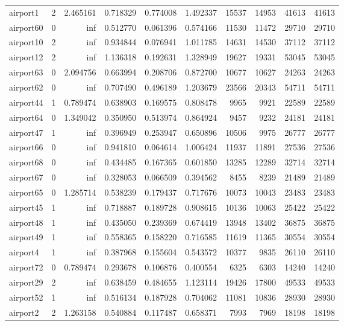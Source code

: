 \begin{longtable}{|l|r|r|r|r|r|r|r|r|r|}
airport1 & 2 & 2.465161 & 0.718329 & 0.774008 & 1.492337 & 15537 & 14953 & 41613 & 41613 \\
airport60 & 0 & inf & 0.512770 & 0.061396 & 0.574166 & 11530 & 11472 & 29710 & 29710 \\
airport10 & 2 & inf & 0.934844 & 0.076941 & 1.011785 & 14631 & 14530 & 37112 & 37112 \\
airport12 & 2 & inf & 1.136318 & 0.192631 & 1.328949 & 19627 & 19331 & 53045 & 53045 \\
airport63 & 0 & 2.094756 & 0.663994 & 0.208706 & 0.872700 & 10677 & 10627 & 24263 & 24263 \\
airport62 & 0 & inf & 0.707490 & 0.496189 & 1.203679 & 23566 & 20343 & 54711 & 54711 \\
airport44 & 1 & 0.789474 & 0.638903 & 0.169575 & 0.808478 & 9965 & 9921 & 22589 & 22589 \\
airport64 & 0 & 1.349042 & 0.350950 & 0.513974 & 0.864924 & 9457 & 9232 & 24181 & 24181 \\
airport47 & 1 & inf & 0.396949 & 0.253947 & 0.650896 & 10506 & 9975 & 26777 & 26777 \\
airport66 & 0 & inf & 0.941810 & 0.064614 & 1.006424 & 11937 & 11891 & 27536 & 27536 \\
airport68 & 0 & inf & 0.434485 & 0.167365 & 0.601850 & 13285 & 12289 & 32714 & 32714 \\
airport67 & 0 & inf & 0.328053 & 0.066509 & 0.394562 & 8455 & 8239 & 21489 & 21489 \\
airport65 & 0 & 1.285714 & 0.538239 & 0.179437 & 0.717676 & 10073 & 10043 & 23483 & 23483 \\
airport45 & 1 & inf & 0.718887 & 0.189728 & 0.908615 & 10136 & 10063 & 25422 & 25422 \\
airport48 & 1 & inf & 0.435050 & 0.239369 & 0.674419 & 13948 & 13402 & 36875 & 36875 \\
airport49 & 1 & inf & 0.558365 & 0.158220 & 0.716585 & 11619 & 11365 & 30554 & 30554 \\
airport4 & 1 & inf & 0.387968 & 0.155604 & 0.543572 & 10377 & 9835 & 26110 & 26110 \\
airport72 & 0 & 0.789474 & 0.293678 & 0.106876 & 0.400554 & 6325 & 6303 & 14240 & 14240 \\
airport29 & 2 & inf & 0.638459 & 0.484655 & 1.123114 & 19426 & 17800 & 49533 & 49533 \\
airport52 & 1 & inf & 0.516134 & 0.187928 & 0.704062 & 11081 & 10836 & 28930 & 28930 \\
airport2 & 2 & 1.263158 & 0.540884 & 0.117487 & 0.658371 & 7993 & 7969 & 18198 & 18198 \\

\end{longtable}
